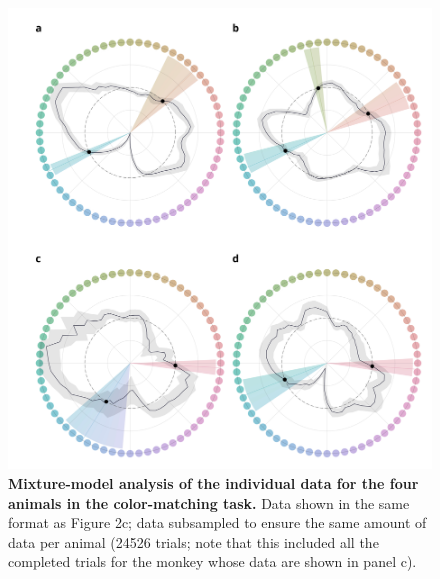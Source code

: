\begin{figure}
    \centering
    \begin{fullwidth}
    \includegraphics[width=\textwidth+4cm]{../Figures/flat/SI4_MM.jpg}
    \caption{\textbf{Mixture-model analysis of the individual data for the four animals in the color-matching task.}
    Data shown in the same format as Figure 2c; data subsampled to ensure the same amount of data per animal (24526 trials; note that this included all the completed trials for the monkey whose data are shown in panel c).
    } 
    \label{fig:IndiMM}
    \end{fullwidth}
\end{figure}

